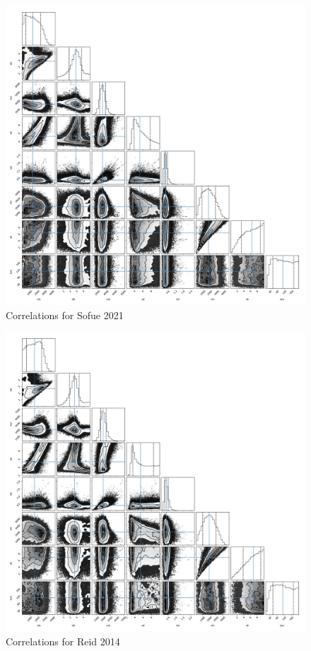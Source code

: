 \documentclass[fleqn,usenatbib]{mnras}
\begin{document}
\begin{figure}
\includegraphics[width=\columnwidth]{Model_I/Plots/Sofue(2021)/emcee_corner_10000_100.pdf}
\caption{Correlations for Sofue 2021
}
\label{fig:Model1_Sofue2021}
\end{figure}

\begin{figure}
\includegraphics[width=\columnwidth]{Model_I/Plots/Reid(2014)/emcee_corner_10000_100.pdf}
\caption{Correlations for Reid 2014
}
\label{fig:Model1_Reid2014}
\end{figure}
\end{document}
